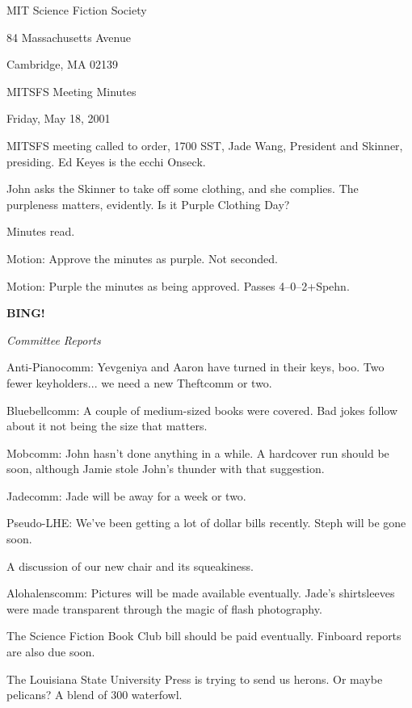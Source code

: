 \documentclass[12pt]{article}
\newcommand{\bing}{{\bf BING!} }
\newcommand{\goto}[1]{\bing \vskip 12pt \centerline{{\em{#1}}}}
\begin{document}
\begin{center}

MIT Science Fiction Society 

84 Massachusetts Avenue

Cambridge, MA 02139

\vspace{12pt}

MITSFS Meeting Minutes 

Friday, May 18, 2001

\end{center}
 
\vspace{18pt}

\setlength{\parskip}{6pt}

\noindent
MITSFS meeting called to order, 1700 SST, Jade Wang, President and
Skinner, presiding.  Ed Keyes is the ecchi Onseck.

John asks the Skinner to take off some clothing, and she complies.
The purpleness matters, evidently.  Is it Purple Clothing Day?

Minutes read.

Motion: Approve the minutes as purple.  Not seconded.

Motion: Purple the minutes as being approved.  Passes 4--0--2+Spehn.

\goto{Committee Reports}

Anti-Pianocomm: Yevgeniya and Aaron have turned in their keys, boo.
Two fewer keyholders... we need a new Theftcomm or two.

Bluebellcomm: A couple of medium-sized books were covered.  Bad jokes
follow about it not being the size that matters.

Mobcomm: John hasn't done anything in a while.  A hardcover run should
be soon, although Jamie stole John's thunder with that suggestion.

Jadecomm: Jade will be away for a week or two.

Pseudo-LHE: We've been getting a lot of dollar bills recently.  Steph
will be gone soon.

A discussion of our new chair and its squeakiness.

Alohalenscomm: Pictures will be made available eventually.  Jade's
shirtsleeves were made transparent through the magic of flash
photography.

The Science Fiction Book Club bill should be paid eventually.  Finboard
reports are also due soon.

The Louisiana State University Press is trying to send us herons.
Or maybe pelicans?  A blend of 300 waterfowl.
\end{document}
